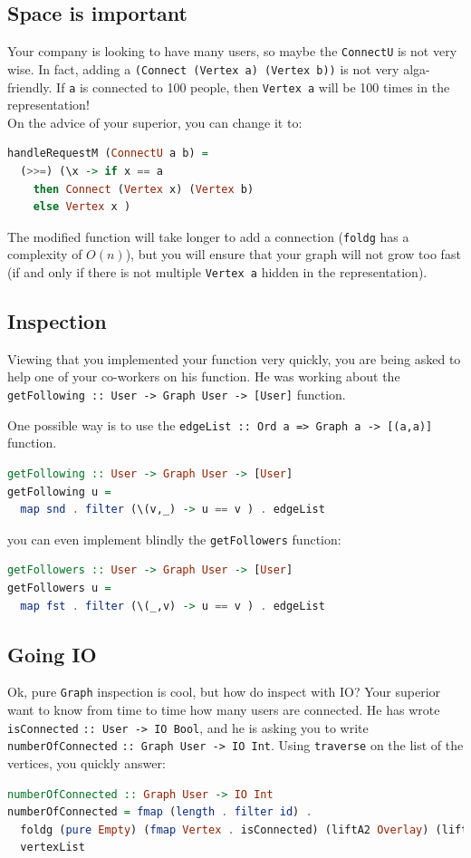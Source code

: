 \documentclass[10pt,a4paper]{article}
\begin{document}
\subsection{Space is important}
Your company is looking to have many users, so maybe the \verb|ConnectU| is not very wise. In fact, adding a \verb|(Connect (Vertex a) (Vertex b))| is not very alga-friendly. If \verb|a| is connected to 100 people, then \verb|Vertex a| will be 100 times in the representation!
\\
On the advice of your superior, you can change it to:
\begin{lstlisting}[language=Haskell, frame=single]
handleRequestM (ConnectU a b) =
  (>>=) (\x -> if x == a
    then Connect (Vertex x) (Vertex b)
    else Vertex x )
\end{lstlisting}
The modified function will take longer to add a connection (\verb|foldg| has a complexity of $O(n)$), but you will ensure that your graph will not grow too fast (if and only if there is not multiple \verb|Vertex a| hidden in the representation).

\subsection{Inspection}
Viewing that you implemented your function very quickly, you are being asked to help one of your co-workers on his function. He was working about the \verb|getFollowing :: User -> Graph User -> [User]| function.

One possible way is to use the \verb|edgeList :: Ord a => Graph a -> [(a,a)]| function.

\begin{lstlisting}[language=Haskell, frame=single]
getFollowing :: User -> Graph User -> [User]
getFollowing u =
  map snd . filter (\(v,_) -> u == v ) . edgeList
\end{lstlisting}

you can even implement blindly the \verb|getFollowers| function:
\begin{lstlisting}[language=Haskell, frame=single]
getFollowers :: User -> Graph User -> [User]
getFollowers u =
  map fst . filter (\(_,v) -> u == v ) . edgeList
\end{lstlisting}

\subsection{Going IO}
Ok, pure \verb|Graph| inspection is cool, but how do inspect with IO? Your superior want to know from time to time how many users are connected. He has wrote \verb|isConnected| \verb|:: User -> IO Bool|, and he is asking you to write \verb|numberOfConnected| \verb|:: Graph User -> IO Int|. Using \verb|traverse| on the list of the vertices, you quickly answer:
\begin{lstlisting}[language=Haskell, frame=single]
numberOfConnected :: Graph User -> IO Int
numberOfConnected = fmap (length . filter id) .
  foldg (pure Empty) (fmap Vertex . isConnected) (liftA2 Overlay) (liftA2 Connect) .
  vertexList
\end{lstlisting}
\end{document}
